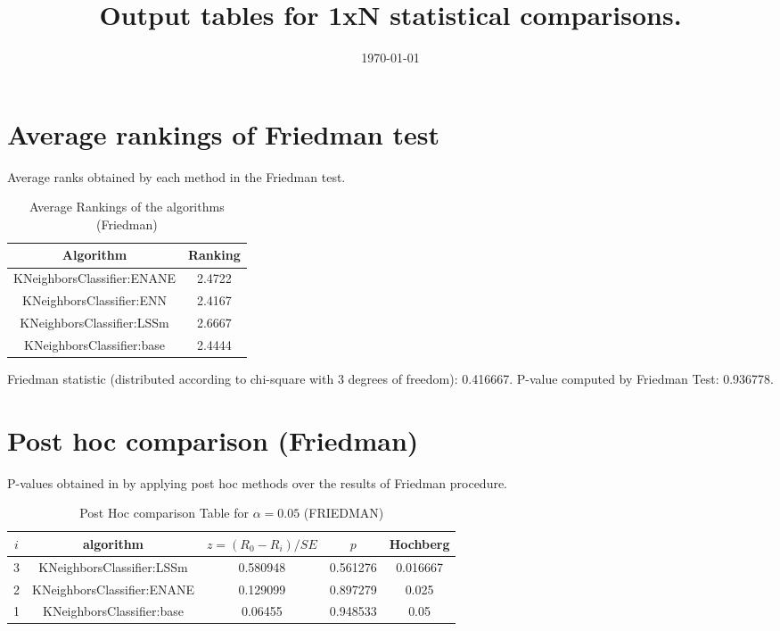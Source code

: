 \documentclass[a4paper,10pt]{article}
\title{Output tables for 1xN statistical comparisons.}
\author{}
\date{\today}
\begin{document}
\begin{landscape}
\pagestyle{empty}
\maketitle
\thispagestyle{empty}

\section{Average rankings of Friedman test}


Average ranks obtained by each method in the Friedman test.

\begin{table}[!htp]
\centering
\begin{tabular}{|c|c|}\hline
Algorithm&Ranking\\\hline
KNeighborsClassifier:ENANE&2.4722\\KNeighborsClassifier:ENN&2.4167\\KNeighborsClassifier:LSSm&2.6667\\KNeighborsClassifier:base&2.4444\\\hline\end{tabular}
\caption{Average Rankings of the algorithms (Friedman)}
\end{table}

Friedman statistic (distributed according to chi-square with 3 degrees of freedom): 0.416667. \newline P-value computed by Friedman Test: 0.936778.\newline


\newpage

\section{Post hoc comparison (Friedman)}


P-values obtained in by applying post hoc methods over the results of Friedman procedure.

\begin{table}[!htp]
\centering\footnotesize
\begin{tabular}{ccccc}
$i$&algorithm&$z=(R_0 - R_i)/SE$&$p$&Hochberg \\
\hline3&KNeighborsClassifier:LSSm&0.580948&0.561276&0.016667\\2&KNeighborsClassifier:ENANE&0.129099&0.897279&0.025\\1&KNeighborsClassifier:base&0.06455&0.948533&0.05\\\hline
\end{tabular}
\caption{Post Hoc comparison Table for $\alpha=0.05$ (FRIEDMAN)}
\end{table}
\newpage


\end{landscape}
\end{document}
